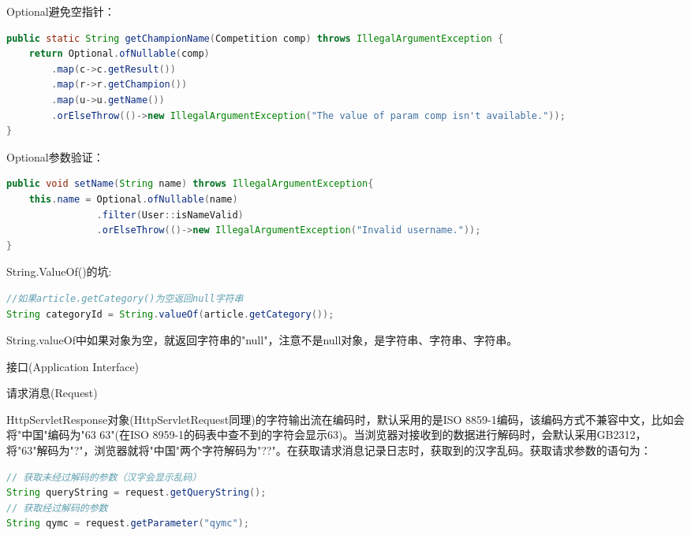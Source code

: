 \documentclass[12pt]{book}
\makeatletter
\numberwithin{dummy}{section}
\theoremstyle{ocrenumbox}
\theoremstyle{blacknumex}
\theoremstyle{blacknumbox}
\theoremstyle{ocrenum}
\renewcommand{\section}{\@startsection{section}{1}{\z@}
	{-4ex \@plus -1ex \@minus -.4ex}
	{1ex \@plus.2ex }
	{\normalfont\large\sffamily\bfseries}}
\renewcommand{\subsection}{\@startsection {subsection}{2}{\z@}
	{-3ex \@plus -0.1ex \@minus -.4ex}
	{0.5ex \@plus.2ex }
	{\normalfont\sffamily\bfseries}}
\newlength\esp
\makeatother
\begin{document}
Optional避免空指针：

\begin{lstlisting}[language=Java]
public static String getChampionName(Competition comp) throws IllegalArgumentException {
	return Optional.ofNullable(comp)
		.map(c->c.getResult())
		.map(r->r.getChampion())
		.map(u->u.getName())
		.orElseThrow(()->new IllegalArgumentException("The value of param comp isn't available."));
}
\end{lstlisting}

Optional参数验证：

\begin{lstlisting}[language=Java]
public void setName(String name) throws IllegalArgumentException{
	this.name = Optional.ofNullable(name)
				.filter(User::isNameValid)
				.orElseThrow(()->new IllegalArgumentException("Invalid username."));
}
\end{lstlisting}


String.ValueOf()的坑:

\begin{lstlisting}[language=Java]
//如果article.getCategory()为空返回null字符串
String categoryId = String.valueOf(article.getCategory());
\end{lstlisting}

String.valueOf中如果对象为空，就返回字符串的"null"，注意不是null对象，是字符串、字符串、字符串。

\section{接口(Application Interface)}

\subsection{请求消息(Request)}

HttpServletResponse对象(HttpServletRequest同理)的字符输出流在编码时，默认采用的是ISO 8859-1编码，该编码方式不兼容中文，比如会将"中国"编码为"63 63"(在ISO 8959-1的码表中查不到的字符会显示63)。当浏览器对接收到的数据进行解码时，会默认采用GB2312，将"63"解码为"?"，浏览器就将"中国"两个字符解码为"??"。在获取请求消息记录日志时，获取到的汉字乱码。获取请求参数的语句为：

\begin{lstlisting}[language=Java]
// 获取未经过解码的参数（汉字会显示乱码）
String queryString = request.getQueryString();
// 获取经过解码的参数
String qymc = request.getParameter("qymc");
\end{lstlisting}
\end{document}
